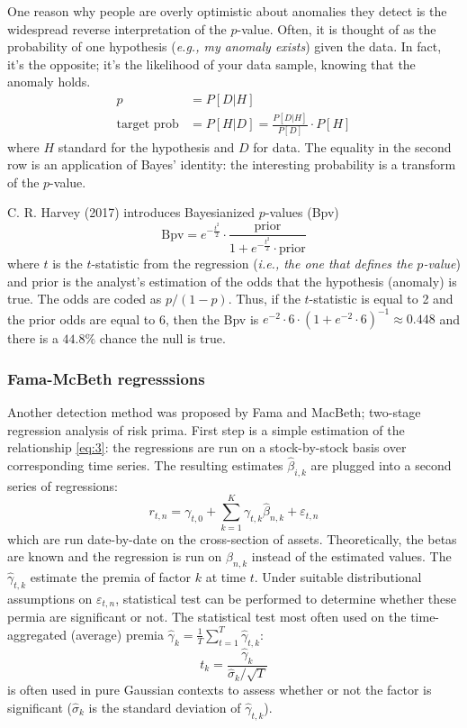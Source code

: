 One reason why people are overly optimistic about anomalies they detect is the widespread reverse interpretation of the $p$-value. Often, it is thought of as the probability of one hypothesis (\textit{e.g., my anomaly exists}) given the data. In fact, it's the opposite; it's the likelihood of your data sample, knowing that the anomaly holds.
\begin{align*}
    p & = P[D|H] \\
    \text{target prob} & = P[H|D]= \frac{P[D|H]}{P[D]} \cdot P[H]
\end{align*}
where $H$ standard for the hypothesis and $D$ for data. The equality in the second row is an application of Bayes' identity: the interesting probability is a transform of the $p$-value.

C. R. Harvey (2017) introduces Bayesianized $p$-values (Bpv)
\begin{equation*}
    \text{Bpv} = e^{ -\frac{t^{2}}{2} } \cdot \frac{\text{prior}}{1 + e^{ -\frac{t^{2}}{2} } \cdot \text{prior}}
\end{equation*}
where $t$ is the $t$-statistic from the regression (\textit{i.e., the one that defines the $p$-value}) and prior is the analyst's estimation of the odds that the hypothesis (anomaly) is true. The odds are coded as $p/(1-p)$. Thus, if the $t$-statistic is equal to 2 and the prior odds are equal to 6, then the Bpv is $e^{ -2 } \cdot 6 \cdot (1 + e^{ -2 } \cdot 6)^{-1} \approx 0.448$ and there is a $44.8\%$ chance the null is true. 

\subsubsection{Fama-McBeth regresssions}
Another detection method was proposed by Fama and MacBeth; two-stage regression analysis of risk prima. First step is a simple estimation of the relationship \eqref{eq:3}: the regressions are run on a stock-by-stock basis over corresponding time series. The resulting estimates $\hat{\beta}_{i,k}$ are plugged into a second series of regressions: 
\begin{equation*}
    r_{t,n} = \gamma _{t,0} + \sum _{k=1}^{K} \gamma _{t,k} \hat{\beta}_{n,k} + \varepsilon_{t,n}
\end{equation*}
which are run date-by-date on the cross-section of assets. Theoretically, the betas are known and the regression is run on $\beta _{n,k}$ instead of the estimated values. The $\hat{\gamma}_{t,k}$ estimate the premia of factor $k$ at time $t$. Under suitable distributional assumptions on $\varepsilon_{t,n}$, statistical test can be performed to determine whether these permia are significant or not. The statistical test most often used on the time-aggregated (average) premia $\hat{\gamma }_k = \frac{1}{T} \sum _{t=1}^{T} \hat{\gamma }_{t,k}$:
\begin{equation*}
    t_{k} = \frac{\hat{\gamma}_{k}}{\hat{\sigma}_{k}/\sqrt{T}} 
\end{equation*}
is often used in pure Gaussian contexts to assess whether or not the factor is significant ($\hat{\sigma }_k$ is the standard deviation of $\hat{\gamma}_{t,k}$).

